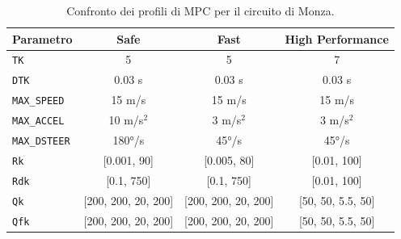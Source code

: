 \begin{table}[H]
\label{tab:monza}
\centering
\begin{tabular}{|l|c|c|c|}
\hline
\textbf{Parametro} & \textbf{Safe} & \textbf{Fast} & \textbf{High Performance} \\
\hline
\verb|TK| & 5 & 5 & 7 \\
\verb|DTK| & 0.03 s & 0.03 s & 0.03 s \\
\verb|MAX_SPEED| & 15 m/s & 15 m/s & 15 m/s \\
\verb|MAX_ACCEL| & 10 m/s$^2$ & 3 m/s$^2$ & 3 m/s$^2$ \\
\verb|MAX_DSTEER| & 180°/s & 45°/s & 45°/s \\
\verb|Rk| & [0.001, 90] & [0.005, 80] & [0.01, 100] \\
\verb|Rdk| & [0.1, 750] & [0.1, 750] & [0.01, 100] \\
\verb|Qk| & [200, 200, 20, 200] & [200, 200, 20, 200] & [50, 50, 5.5, 50] \\
\verb|Qfk| & [200, 200, 20, 200] & [200, 200, 20, 200] & [50, 50, 5.5, 50] \\
\hline
\end{tabular}
\caption{Confronto dei profili di MPC per il circuito di Monza.}
\label{tab:monza_mpc_profiles}
\end{table}

